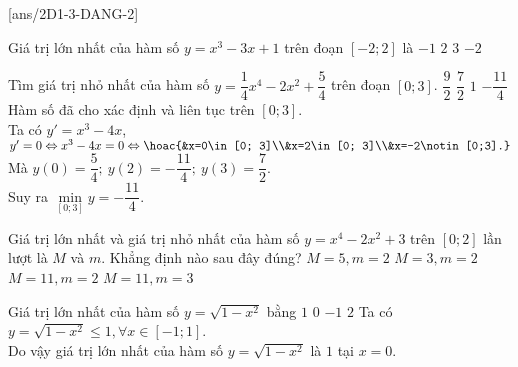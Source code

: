 \BTTN
{}[ans/2D1-3-DANG-2]
\begin{ex}%
    Giá trị lớn nhất của hàm số $y=x^3-3x+1$ trên đoạn $[-2;2]$ là
    \choice
    {$-1$}
    {$2$}
    {\True $3$}
    {$-2$}
\end{ex}
\begin{ex}%
    Tìm giá trị nhỏ nhất của hàm số $y=\dfrac{1}{4}x^4-2x^2+\dfrac{5}{4}$ trên đoạn $[0;3]$.
    \choice
    {$\dfrac{9}{2}$}
    {$\dfrac{7}{2}$}
    {$1$}
    {\True $-\dfrac{11}{4}$}
    \loigiai
    {
        Hàm số đã cho xác định và liên tục trên $ [0; 3] $.\\
        Ta có $y'=x^3-4x$, $ y'=0\Leftrightarrow x^3-4x=0\Leftrightarrow\hoac{&x=0\in[0; 3]\\&x=2\in[0; 3]\\&x=-2\notin[0;3].} $\\
        Mà $y(0)=\dfrac{5}{4};~y(2)=-\dfrac{11}{4};~y(3)=\dfrac{7}{2}$.\\
        Suy ra $\min\limits_{[0;3]}y=-\dfrac{11}{4}$.
    }
\end{ex}
\begin{ex}%
    Giá trị lớn nhất và giá trị nhỏ nhất của hàm số $y=x^4-2x^2+3$ trên $[0;2]$ lần lượt là $M$ và $m$. Khẳng định nào sau đây đúng?
    \choice
    {$M=5,m=2$}
    {$M=3,m=2$}
    {\True $M=11,m=2$}
    {$M=11,m=3$}
\end{ex}
\begin{ex}%
    Giá trị lớn nhất của hàm số $ y = \sqrt{1-x^2} $ bằng
    \choice
    {\True $ 1 $}
    {$ 0$}
    {$ -1 $}
    {$ 2 $}
    \loigiai
    { 	Ta có $ y = \sqrt{1-x^2} \le 1, \forall x \in \left[-1;1\right]$.\\ Do vậy giá trị lớn nhất của hàm số $ y = \sqrt{1-x^2} $ là $ 1 $ tại $ x=0 $.
    }
\end{ex}
